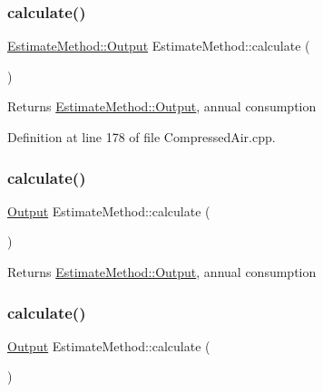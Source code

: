 \subsubsection{\texorpdfstring{calculate()}{calculate()}\hspace{0.1cm}{\footnotesize\ttfamily [1/3]}}
{\footnotesize\ttfamily \hyperlink{struct_estimate_method_1_1_output}{Estimate\+Method\+::\+Output} Estimate\+Method\+::calculate (\begin{DoxyParamCaption}{ }\end{DoxyParamCaption})}

\begin{DoxyReturn}{Returns}
\hyperlink{struct_estimate_method_1_1_output}{Estimate\+Method\+::\+Output}, annual consumption 
\end{DoxyReturn}


Definition at line 178 of file Compressed\+Air.\+cpp.

\mbox{\label{class_estimate_method_aed4e370d0b5c2141735af9acacccdedf}} 
\subsubsection{\texorpdfstring{calculate()}{calculate()}\hspace{0.1cm}{\footnotesize\ttfamily [2/3]}}
{\footnotesize\ttfamily \hyperlink{struct_estimate_method_1_1_output}{Output} Estimate\+Method\+::calculate (\begin{DoxyParamCaption}{ }\end{DoxyParamCaption})}

\begin{DoxyReturn}{Returns}
\hyperlink{struct_estimate_method_1_1_output}{Estimate\+Method\+::\+Output}, annual consumption 
\end{DoxyReturn}
\mbox{\label{class_estimate_method_aed4e370d0b5c2141735af9acacccdedf}} 
\subsubsection{\texorpdfstring{calculate()}{calculate()}\hspace{0.1cm}{\footnotesize\ttfamily [3/3]}}
{\footnotesize\ttfamily \hyperlink{struct_estimate_method_1_1_output}{Output} Estimate\+Method\+::calculate (\begin{DoxyParamCaption}{ }\end{DoxyParamCaption})}


